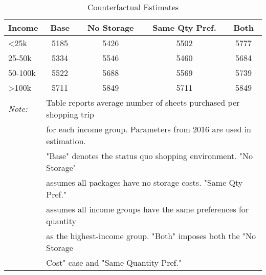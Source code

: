 \begin{table}[!htbp] \centering
\caption{Counterfactual Estimates}
\label{tab:counterfactualMNL}
\begin{tabular}{lcccc}
\hline
Income   & Base   & No Storage  &  Same Qty Pref.  & Both \\
\hline
<25k     & 5185   & 5426              & 5502                  & 5777 \\
25-50k   & 5334   & 5546              & 5460                  & 5684 \\
50-100k  & 5522   & 5688              & 5569                  & 5739 \\
>100k    & 5711   & 5849              & 5711                  & 5849 \\
\hline
\hline
\textit{Note:}  & \multicolumn{4}{l}{\footnotesize{Table reports average number of sheets purchased per shopping trip}} \\
 & \multicolumn{4}{l}{\footnotesize{for each income group. Parameters from 2016 are used in estimation.}} \\
  & \multicolumn{4}{l}{\footnotesize{"Base" denotes the status quo shopping environment. "No Storage"}} \\
 & \multicolumn{4}{l}{\footnotesize{assumes all packages have no storage costs. "Same Qty Pref."}} \\
 & \multicolumn{4}{l}{\footnotesize{assumes all income groups have the same preferences for quantity}} \\
 & \multicolumn{4}{l}{\footnotesize{as the highest-income group. "Both" imposes both the "No Storage}} \\
 & \multicolumn{4}{l}{\footnotesize{Cost" case and "Same Quantity Pref."}} \\
\end{tabular}
\end{table}
